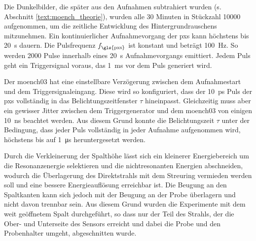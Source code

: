 \noindent
Die Dunkelbilder, die später aus den Aufnahmen subtrahiert wurden (s. Abschnitt \ref{text:moench_theorie}), wurden alle 30 Minuten in Stückzahl \num{10000} aufgenommen, um die zeitliche Entwicklung des Hintergrundrauschens mitzunehmen. Ein kontinuierlicher Aufnahmevorgang der \gls{pxs} kann höchstens bis \SI{20}{\second} dauern. Die Pulsfrequenz $f_\text{\gls{pxs}}$ ist konstant und beträgt \SI{100}{\hertz}. So werden \num{2000} Pulse innerhalb eines \SI{20}{\second} Aufnahmevorgangs emittiert. Jedem Puls geht ein Triggersignal voraus, das \SI{1}{\milli\second} vor dem Puls generiert wird.

\noindent
Der \gls{moench03} hat eine einstellbare Verzögerung zwischen dem Aufnahmestart und dem Triggersignaleingang. Diese wird so konfiguriert, dass der \SI{10}{\pico\second} Puls der \gls{pxs} vollständig in das Belichtungszeitfenster $\tau$ hineinpasst. Gleichzeitig muss aber ein gewisser Jitter zwischen dem Triggergenerator und dem \gls{moench03} von einigen \SI{10}{\nano\second} beachtet werden. Aus diesem Grund konnte die Belichtungszeit $\tau$ unter der Bedingung, dass jeder Puls vollständig in jeder Aufnahme aufgenommen wird, höchstens bis auf \SI{1}{\micro\second} heruntergesetzt werden.

\noindent
Durch die Verkleinerung der Spalthöhe lässt sich ein kleinerer Energiebereich um die Resonanzenergie selektieren und die nichtresonanten Energien abschneiden, wodurch die Überlagerung des Direktstrahls mit dem Streuring vermieden werden soll und eine bessere Energieauflösung erreichbar ist. Die Beugung an den Spaltkanten kann sich jedoch mit der Beugung an der Probe überlagern und nicht davon trennbar sein. Aus diesem Grund wurden die Experimente mit dem weit geöffnetem Spalt durchgeführt, so dass nur der Teil des Strahls, der die Ober- und Unterseite des Sensors erreicht und dabei die Probe und den Probenhalter umgeht, abgeschnitten wurde.

